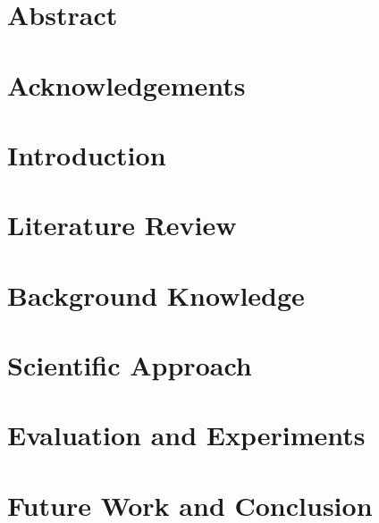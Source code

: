 \documentclass[11pt]{report}
\begin{document}
\chapter*{\centering Abstract}

\chapter*{\centering Acknowledgements}

\tableofcontents
\listoffigures
\chapter*{Introduction}
\chapter*{Literature Review}
\chapter*{Background Knowledge}
\chapter*{Scientific Approach}
\chapter*{Evaluation and Experiments}
\chapter*{Future Work and Conclusion}
\end{document}
